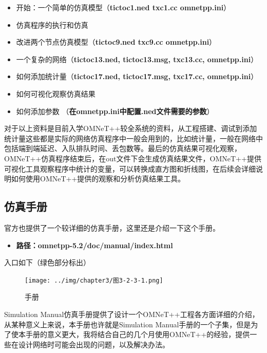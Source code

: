 \begin{itemize}
\item 开始：一个简单的仿真模型（\textbf{tictoc1.ned txc1.cc omnetpp.ini}）

\item 仿真程序的执行和仿真

\item 改进两个节点仿真模型（\textbf{tictoc9.ned txc9.cc omnetpp.ini}）

\item 一个复杂的网络（\textbf{tictoc13.ned, tictoc13.msg, txc13.cc, omnetpp.ini}）

\item 如何添加统计量（\textbf{tictoc17.ned, tictoc17.msg, txc17.cc, omnetpp.ini}）

\item 如何可视化观察仿真结果

\item 如何添加参数 （\textbf{在omnetpp.ini中配置.ned文件需要的参数}）

\end{itemize}

对于以上资料是目前入学OMNeT++较全系统的资料，从工程搭建、调试到添加统计量这些都是实际的网络仿真程序中一般会用到的，比如统计量，一般在网络中包括端到端延迟、入队排队时间、丢包数等。最后的仿真结果可视化观察，OMNeT++仿真程序结束后，在out文件下会生成仿真结果文件，OMNeT++提供可视化工具观察程序中统计的变量，可以转换成直方图和折线图，在后续会详细说明如何使用OMNeT++提供的观察和分析仿真结果工具。

\subsection{仿真手册}
\label{仿真手册}

官方也提供了一个较详细的仿真手册，这里还是介绍一下这个手册。

\begin{itemize}
\item \textbf{路径：omnetpp-5.2\slash doc\slash manual\slash index.html}

\end{itemize}

入口如下（绿色部分标出）

\begin{figure}[htbp]
\centering
\texttt{[image: ../img/chapter3/图3-2-3-1.png]}
\caption{手册}
\end{figure}

Simulation Manual仿真手册提供了设计一个OMNeT++工程各方面详细的介绍，从某种意义上来说，本手册也许就是Simulation Manual手册的一个子集，但是为了使本手册的意义更大，我将结合自己的几个月使用OMNeT++的经验，提供一些在设计网络时可能会出现的问题，以及解决办法。

